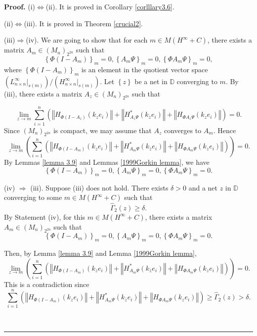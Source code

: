 \documentclass{article}%
\newenvironment{proof}[1][Proof]{\noindent\textbf{#1.} }{\ \rule{0.5em}{0.5em}}
\begin{document}
\begin{proof}
(i)$\Longleftrightarrow$(ii). It is proved in Corollary \ref{corlllary3.6}.

(ii)$\Longleftrightarrow$(iii). It is proved in Theorem \ref{crucial2}.

(iii)$\Longrightarrow$(iv). We are going to show that for each $m\in M\left(
H^{\infty}+C\right)  $, there exists a matrix $A_{m}\in\left(  M_{n}\right)
_{2^{2n}}$ such that%
\[
\left\{  \Phi\left(  I-A_{m}\right)  \right\}  _{m}=0,\left\{  A_{m}%
\Psi\right\}  _{m}=0,\left\{  \Phi A_{m}\Psi\right\}  _{m}=0,
\]
where $\left\{  \Phi\left(  I-A_{m}\right)  \right\}  _{m}$ is an element in
the quotient vector space $(L_{n\times n}^{\infty}|_{s(m)})/(H_{n\times
n}^{\infty}|_{s(m)}).$ Let $\left\{  z\right\}  $ be a net in $\mathbb{D}$
converging to $m$. By (iii), there exists a matrix $A_{z}\in\left(
M_{n}\right)  _{2^{2n}}$ such that%

\[
\lim_{z\rightarrow m}\sum_{i=1}^{n}\left(  \left\Vert H_{\Phi(I-A_{z})}\left(
k_{z}e_{i}\right)  \right\Vert +\left\Vert H_{A_{z}\Psi}^{\ast}\left(
k_{\overline{z}}e_{i}\right)  \right\Vert +\left\Vert H_{\Phi A_{z}\Psi
}\left(  k_{z}e_{i}\right)  \right\Vert \right)  =0.
\]
Since $\left(  M_{n}\right)  _{2^{2n}}$ is compact, we may assume that $A_{z}$
converges to $A_{m}$. Hence%
\[
\lim_{z\rightarrow m}\left(  \sum_{i=1}^{n}\left(  \left\Vert H_{\Phi
(I-A_{m})}\left(  k_{z}e_{i}\right)  \right\Vert +\left\Vert H_{A_{m}\Psi
}^{\ast}\left(  k_{\overline{z}}e_{i}\right)  \right\Vert +\left\Vert H_{\Phi
A_{m}\Psi}\left(  k_{z}e_{i}\right)  \right\Vert \right)  \right)  =0.
\]
By Lemmas \ref{lemma 3.9} and Lemmas \ref{1999Gorkin lemma}, we have%
\[
\left\{  \Phi\left(  I-A_{m}\right)  \right\}  _{m}=0,\left\{  A_{m}%
\Psi\right\}  _{m}=0,\left\{  \Phi A_{m}\Psi\right\}  _{m}=0.
\]


(iv) $\Longrightarrow$ (iii). Suppose (iii) does not hold. There exists
$\delta>0$ and a net $z$ in $\mathbb{D}$ converging to some $m\in M\left(
H^{\infty}+C\right)  $ such that%
\[
\widehat{\Gamma}_{2}(z)\geq\delta.
\]
By Statement (iv), for this $m\in M\left(  H^{\infty}+C\right)  $, there
exists a matrix $A_{m}\in\left(  M_{n}\right)  _{2^{2n}}$ such that%
\[
\left\{  \Phi\left(  I-A_{m}\right)  \right\}  _{m}=0,\left\{  A_{m}%
\Psi\right\}  _{m}=0,\left\{  \Phi A_{m}\Psi\right\}  _{m}=0.
\]


Then, by Lemma \ref{lemma 3.9} and Lemma \ref{1999Gorkin lemma},
\[
\lim_{z\rightarrow m}\left(  \sum_{i=1}^{n}\left(  \left\Vert H_{\Phi
(I-A_{m})}\left(  k_{z}e_{i}\right)  \right\Vert +\left\Vert H_{A_{m}\Psi
}^{\ast}\left(  k_{\overline{z}}e_{i}\right)  \right\Vert +\left\Vert H_{\Phi
A_{m}\Psi}\left(  k_{z}e_{i}\right)  \right\Vert \right)  \right)  =0.
\]
This is a contradiction since%
\[
\sum_{i=1}^{n}\left(  \left\Vert H_{\Phi(I-A_{m})}\left(  k_{z}e_{i}\right)
\right\Vert +\left\Vert H_{A_{m}\Psi}^{\ast}\left(  k_{\overline{z}}%
e_{i}\right)  \right\Vert +\left\Vert H_{\Phi A_{m}\Psi}\left(  k_{z}%
e_{i}\right)  \right\Vert \right)  \geq\widehat{\Gamma}_{2}(z)>\delta.
\]



\end{proof}
\end{document}
